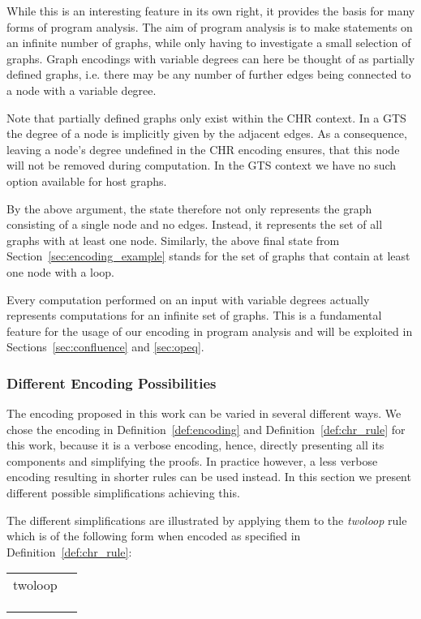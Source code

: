 \documentclass{tlp}
\begin{document}
While this is an interesting feature in its own right, it provides the basis for
many forms of program analysis. The aim of program analysis is to make statements
on an infinite number of graphs, while only having to investigate a small
selection of graphs. Graph encodings with variable degrees can here be thought of
as partially defined graphs, i.e. there may be any number of further edges being
connected to a node with a variable degree. 

Note that partially defined graphs only exist within the CHR context. In a GTS
the degree of a node is implicitly given by the adjacent edges. As a consequence,
leaving a node's degree undefined in the CHR encoding ensures, that this node
will not be removed during computation. In the GTS context we have no such option
available for host graphs.

By the above argument, the state  therefore
not only represents the graph consisting of a single node and no edges. Instead,
it represents the set of all graphs with at least one node. Similarly, the above
final state from Section~\ref{sec:encoding_example} stands for the set of graphs
that contain at least one node with a loop.


Every computation performed on an input with variable degrees actually represents
computations for an infinite set of graphs. This is a fundamental feature for the
usage of our encoding in program analysis and will be exploited in
Sections~\ref{sec:confluence} and \ref{sec:opeq}.

\subsubsection{Different Encoding Possibilities}
\label{sec:diff_encoding}

The encoding proposed in this work can be varied in several different ways. We
chose the encoding in Definition~\ref{def:encoding} and
Definition~\ref{def:chr_rule} for this work, because it is a verbose encoding,
hence, directly presenting all its components and simplifying the proofs. In
practice however, a less verbose encoding resulting in shorter rules can be used
instead. In this section we present different possible simplifications achieving
this.

The different simplifications are illustrated by applying them to the
\emph{twoloop} rule which is of the following form when encoded as specified in
Definition~\ref{def:chr_rule}:

\begin{center} 
\begin{tabular}{ll} 
twoloop  & \\
& \\
& \\
& 
\end{tabular}
\end{center}
\end{document}
